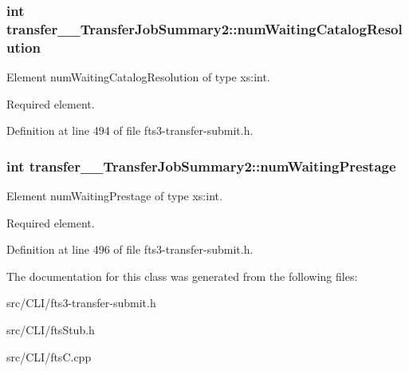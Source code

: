 \subsubsection[{numWaitingCatalogResolution}]{\setlength{\rightskip}{0pt plus 5cm}int {\bf transfer\_\-\_\-TransferJobSummary2::numWaitingCatalogResolution}}\label{classtransfer____TransferJobSummary2_af66bc9b0ee756f19dfbad94feeebbc80}


Element numWaitingCatalogResolution of type xs:int. 

Required element. 

Definition at line 494 of file fts3-\/transfer-\/submit.h.

\subsubsection[{numWaitingPrestage}]{\setlength{\rightskip}{0pt plus 5cm}int {\bf transfer\_\-\_\-TransferJobSummary2::numWaitingPrestage}}\label{classtransfer____TransferJobSummary2_a883772b27795f6adc7d1551d26cc05f6}


Element numWaitingPrestage of type xs:int. 

Required element. 

Definition at line 496 of file fts3-\/transfer-\/submit.h.



The documentation for this class was generated from the following files:\begin{DoxyCompactItemize}
\item 
src/CLI/fts3-\/transfer-\/submit.h\item 
src/CLI/ftsStub.h\item 
src/CLI/ftsC.cpp\end{DoxyCompactItemize}
